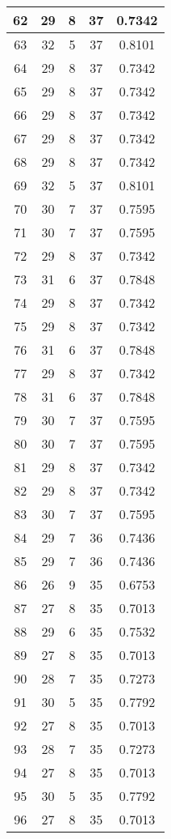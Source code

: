 \documentclass[letterpaper, 12pt]{article}
\begin{document}
\begin{longtable}{|c|c|c|c|c|}
\hline
62 & 29 & 8 & 37 & 0.7342 \\
\hline
63 & 32 & 5 & 37 & 0.8101 \\
\hline
64 & 29 & 8 & 37 & 0.7342 \\
\hline
65 & 29 & 8 & 37 & 0.7342 \\
\hline
66 & 29 & 8 & 37 & 0.7342 \\
\hline
67 & 29 & 8 & 37 & 0.7342 \\
\hline
68 & 29 & 8 & 37 & 0.7342 \\
\hline
69 & 32 & 5 & 37 & 0.8101 \\
\hline
70 & 30 & 7 & 37 & 0.7595 \\
\hline
71 & 30 & 7 & 37 & 0.7595 \\
\hline
72 & 29 & 8 & 37 & 0.7342 \\
\hline
73 & 31 & 6 & 37 & 0.7848 \\
\hline
74 & 29 & 8 & 37 & 0.7342 \\
\hline
75 & 29 & 8 & 37 & 0.7342 \\
\hline
76 & 31 & 6 & 37 & 0.7848 \\
\hline
77 & 29 & 8 & 37 & 0.7342 \\
\hline
78 & 31 & 6 & 37 & 0.7848 \\
\hline
79 & 30 & 7 & 37 & 0.7595 \\
\hline
80 & 30 & 7 & 37 & 0.7595 \\
\hline
81 & 29 & 8 & 37 & 0.7342 \\
\hline
82 & 29 & 8 & 37 & 0.7342 \\
\hline
83 & 30 & 7 & 37 & 0.7595 \\
\hline
84 & 29 & 7 & 36 & 0.7436 \\
\hline
85 & 29 & 7 & 36 & 0.7436 \\
\hline
86 & 26 & 9 & 35 & 0.6753 \\
\hline
87 & 27 & 8 & 35 & 0.7013 \\
\hline
88 & 29 & 6 & 35 & 0.7532 \\
\hline
89 & 27 & 8 & 35 & 0.7013 \\
\hline
90 & 28 & 7 & 35 & 0.7273 \\
\hline
91 & 30 & 5 & 35 & 0.7792 \\
\hline
92 & 27 & 8 & 35 & 0.7013 \\
\hline
93 & 28 & 7 & 35 & 0.7273 \\
\hline
94 & 27 & 8 & 35 & 0.7013 \\
\hline
95 & 30 & 5 & 35 & 0.7792 \\
\hline
96 & 27 & 8 & 35 & 0.7013 \\

\end{longtable}
\end{document}
